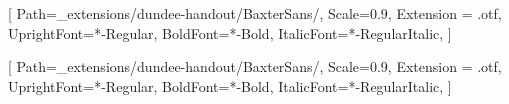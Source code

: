 \setsansfont{BaxterSans}[
    Path=_extensions/dundee-handout/BaxterSans/,
    Scale=0.9,
    Extension = .otf,
    UprightFont=*-Regular,
    BoldFont=*-Bold,
    ItalicFont=*-RegularItalic,
    ]

\setmainfont{BaxterSans}[
    Path=_extensions/dundee-handout/BaxterSans/,
    Scale=0.9,
    Extension = .otf,
    UprightFont=*-Regular,
    BoldFont=*-Bold,
    ItalicFont=*-RegularItalic,
    ]
    
\newcommand{\FHlabel}{Filehistory:}

\newenvironment{filehistory}{%
  \medskip\noindent
  \begingroup\small\color{gray}\ignorespaces
}{%
  \par\endgroup
}

\newenvironment{filehistorybottom}{%
  \vspace*{\fill}\noindent
  \begingroup\small\color{gray}\ignorespaces
}{%
  \par\endgroup
}
